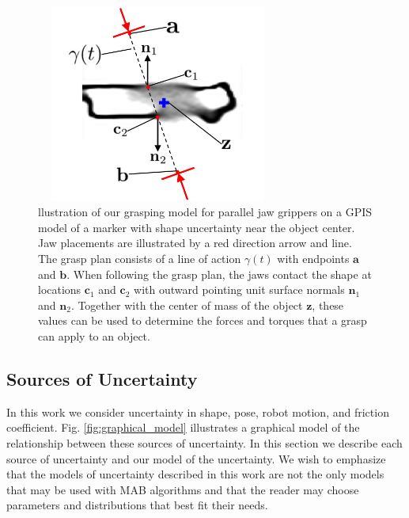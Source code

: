 \documentclass[journal,transmag]{IEEEtran}%
\newcommand{\ba}{\mathbf{a}}
\newcommand{\bb}{\mathbf{b}}
\newcommand{\bc}{\mathbf{c}}
\newcommand{\bn}{\mathbf{n}}
\newcommand{\bz}{\mathbf{z}}
\begin{document}

\begin{figure}[t!]
\centering
\includegraphics[width = 8cm, height = 6.5cm]{figures/grasp_model.jpg}
\caption{llustration of our grasping model for parallel jaw grippers on a GPIS model of a marker with shape uncertainty near the object center. Jaw placements are illustrated by a red direction arrow and line. The grasp plan consists of a line of action $\gamma(t)$ with endpoints $\ba$ and $\bb$. When following the grasp plan, the jaws contact the shape at locations $\bc_1$ and $\bc_2$ with outward pointing unit surface normals $\bn_1$ and $\bn_2$. Together with the center of mass of the object $\bz$, these values can be used to determine the forces and torques that a grasp can apply to an object. }
\vspace*{-4ex}
\label{fig:grasp_model}
\end{figure}

\subsection{Sources of Uncertainty}
In this work we consider uncertainty in shape, pose, robot motion, and friction coefficient.
Fig. \ref{fig:graphical_model} illustrates a graphical model of the relationship between these sources of uncertainty.
In this section we describe each source of uncertainty and our model of the uncertainty.
We wish to emphasize that the models of uncertainty described in this work are not the only models that may be used with MAB algorithms and that the reader may choose parameters and distributions that best fit their needs. 
\end{document}
